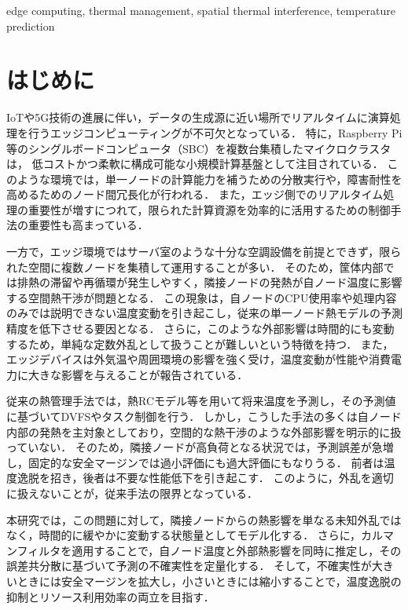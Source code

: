 \documentclass[techrep]{ipsj}
\begin{document}
\begin{ekeyword}
edge computing, thermal management, spatial thermal interference, temperature prediction
\end{ekeyword}
\maketitle

\section{はじめに}

IoTや5G技術の進展に伴い，データの生成源に近い場所でリアルタイムに演算処理を行うエッジコンピューティングが不可欠となっている\cite{shi2016edge}．
特に，Raspberry Pi 等のシングルボードコンピュータ（SBC）を複数台集積したマイクロクラスタは，
低コストかつ柔軟に構成可能な小規模計算基盤として注目されている\cite{iridispi2014}．
このような環境では，単一ノードの計算能力を補うための分散実行や，障害耐性を高めるためのノード間冗長化が行われる．
また，エッジ側でのリアルタイム処理の重要性が増すにつれて，限られた計算資源を効率的に活用するための制御手法の重要性も高まっている．

一方で，エッジ環境ではサーバ室のような十分な空調設備を前提とできず，限られた空間に複数ノードを集積して運用することが多い．
そのため，筐体内部では排熱の滞留や再循環が発生しやすく，隣接ノードの発熱が自ノード温度に影響する空間熱干渉が問題となる．
この現象は，自ノードのCPU使用率や処理内容のみでは説明できない温度変動を引き起こし，従来の単一ノード熱モデルの予測精度を低下させる要因となる．
さらに，このような外部影響は時間的にも変動するため，単純な定数外乱として扱うことが難しいという特徴を持つ．
また，エッジデバイスは外気温や周囲環境の影響を強く受け，温度変動が性能や消費電力に大きな影響を与えることが報告されている\cite{edgeengine2023}．

従来の熱管理手法では，熱RCモデル等を用いて将来温度を予測し，その予測値に基づいてDVFSやタスク制御を行う．
しかし，こうした手法の多くは自ノード内部の発熱を主対象としており，空間的な熱干渉のような外部影響を明示的に扱っていない．
そのため，隣接ノードが高負荷となる状況では，予測誤差が急増し，固定的な安全マージンでは過小評価にも過大評価にもなりうる．
前者は温度逸脱を招き，後者は不要な性能低下を引き起こす．
このように，外乱を適切に扱えないことが，従来手法の限界となっている．

本研究では，この問題に対して，隣接ノードからの熱影響を単なる未知外乱ではなく，時間的に緩やかに変動する状態量としてモデル化する．
さらに，カルマンフィルタを適用することで，自ノード温度と外部熱影響を同時に推定し，その誤差共分散に基づいて予測の不確実性を定量化する．
そして，不確実性が大きいときには安全マージンを拡大し，小さいときには縮小することで，温度逸脱の抑制とリソース利用効率の両立を目指す．
\end{document}
